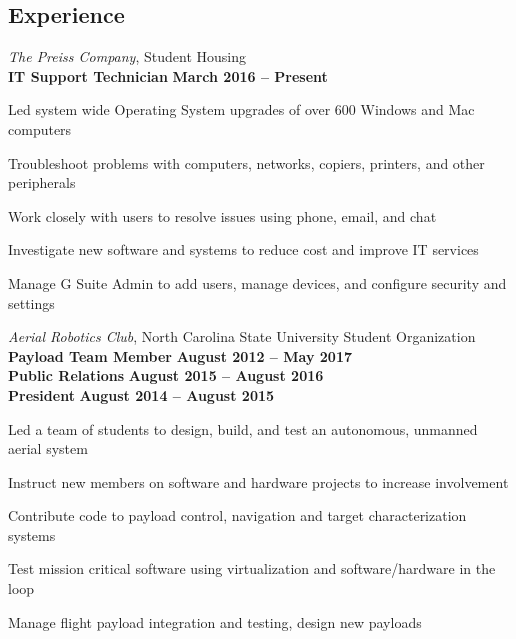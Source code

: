 \documentclass[margin,line]{resume}
\begin{document}
\begin{resume}
    \section{\mysidestyle Experience}


    \textsl{The Preiss Company}, Student Housing\\
    \textbf{IT Support Technician}  \hfill \textbf{March 2016 -- Present}\\
    \vspace{-4mm}
    \begin{list2}
    \item Led system wide Operating System upgrades of over 600 Windows and Mac computers
    \item Troubleshoot problems with computers, networks, copiers, printers, and other peripherals
    \item Work closely with users to resolve issues using phone, email, and chat
    \item Investigate new software and systems to reduce cost and improve IT services
    \item  Manage G Suite Admin to add users, manage devices, and configure security and settings
    \end{list2}
    \vspace{3mm}




    \textsl{Aerial Robotics Club}, North Carolina State University Student Organization\\
    \textbf{Payload Team Member} \hfill \textbf{August 2012 -- May 2017}\\
    \textbf{Public Relations} \hfill \textbf{August 2015 -- August 2016}\\
    \textbf{President} \hfill \textbf{August 2014 -- August 2015}\\
    \vspace{-3mm}
    \begin{list2}
    \item Led a team of students to design, build, and test an autonomous, unmanned aerial system
    \item Instruct new members on software and hardware projects to increase involvement
    \item Contribute code to payload control, navigation and target characterization systems
    \item Test mission critical software using virtualization and software/hardware in the loop
    \item Manage flight payload integration and testing, design new payloads
    \end{list2}
    \vspace{3mm}





\end{resume}
\end{document}
